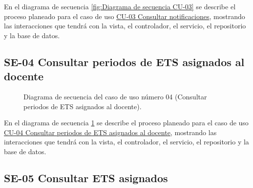 En el diagrama de secuencia \ref{fig:Diagrama de secuencia CU-03} se describe el proceso planeado para el caso de uso \hyperlink{CU-03}{CU-03 Consultar notificaciones}, mostrando las interacciones que tendrá con la vista, el controlador, el servicio, el repositorio y la base de datos.

\newpage

\subsection{SE-04 Consultar periodos de ETS asignados al docente}

\begin{figure}[htbp!]
	\begin{center}
		\caption{Diagrama de secuencia del caso de uso número 04 (Consultar periodos de ETS asignados al docente).}
		\label{fig:Diagrama de secuencia CU-04}
	\end{center}
\end{figure}

En el diagrama de secuencia \ref{fig:Diagrama de secuencia CU-04} se describe el proceso planeado para el caso de uso \hyperlink{CU-04}{CU-04 Consultar periodos de ETS asignados al docente}, mostrando las interacciones que tendrá con la vista, el controlador, el servicio, el repositorio y la base de datos.

\newpage

\subsection{SE-05 Consultar ETS asignados}

